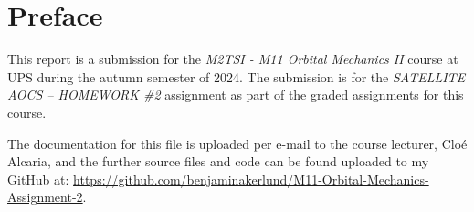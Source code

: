 \section*{Preface}

This report is a submission for the \textit{M2TSI - M11 Orbital Mechanics II} course at UPS during the autumn semester of 2024.
The submission is for the \textit{SATELLITE AOCS – HOMEWORK \#2} assignment as part of the graded assignments for this course.

The documentation for this file is uploaded per e-mail to the course lecturer, Cloé Alcaria, and the further source files and code can be found uploaded to my GitHub at:
\url{https://github.com/benjaminakerlund/M11-Orbital-Mechanics-Assignment-2}.





